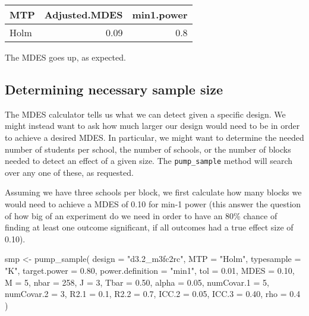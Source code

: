 \documentclass[
]{article}
\newenvironment{Shaded}{\begin{snugshade}}{\end{snugshade}}
\newcommand{\AttributeTok}[1]{\textcolor[rgb]{0.77,0.63,0.00}{#1}}
\newcommand{\DecValTok}[1]{\textcolor[rgb]{0.00,0.00,0.81}{#1}}
\newcommand{\FloatTok}[1]{\textcolor[rgb]{0.00,0.00,0.81}{#1}}
\newcommand{\FunctionTok}[1]{\textcolor[rgb]{0.00,0.00,0.00}{#1}}
\newcommand{\NormalTok}[1]{#1}
\newcommand{\OtherTok}[1]{\textcolor[rgb]{0.56,0.35,0.01}{#1}}
\newcommand{\StringTok}[1]{\textcolor[rgb]{0.31,0.60,0.02}{#1}}
\begin{document}
\begin{tabular}{l|r|r}
\hline
MTP & Adjusted.MDES & min1.power\\
\hline
Holm & 0.09 & 0.8\\
\hline
\end{tabular}

The MDES goes up, as expected.

\subsection{Determining necessary sample size}

The MDES calculator tells us what we can detect given a specific design.
We might instead want to ask how much larger our design would need to be
in order to achieve a desired MDES. In particular, we might want to
determine the needed number of students per school, the number of
schools, or the number of blocks needed to detect an effect of a given
size. The \texttt{pump\_sample} method will search over any one of
these, as requested.

Assuming we have three schools per block, we first calculate how many
blocks we would need to achieve a MDES of 0.10 for min-1 power (this
answer the question of how big of an experiment do we need in order to
have an 80\% chance of finding at least one outcome significant, if all
outcomes had a true effect size of 0.10).

\begin{Shaded}
\begin{Highlighting}[]
\NormalTok{smp }\OtherTok{\textless{}{-}} \FunctionTok{pump\_sample}\NormalTok{(}
  \AttributeTok{design =} \StringTok{"d3.2\_m3fc2rc"}\NormalTok{,}
  \AttributeTok{MTP =} \StringTok{"Holm"}\NormalTok{,}
  \AttributeTok{typesample =} \StringTok{"K"}\NormalTok{,}
  \AttributeTok{target.power =} \FloatTok{0.80}\NormalTok{, }\AttributeTok{power.definition =} \StringTok{"min1"}\NormalTok{, }\AttributeTok{tol =} \FloatTok{0.01}\NormalTok{,}
  \AttributeTok{MDES =} \FloatTok{0.10}\NormalTok{, }\AttributeTok{M =} \DecValTok{5}\NormalTok{, }\AttributeTok{nbar =} \DecValTok{258}\NormalTok{, }\AttributeTok{J =} \DecValTok{3}\NormalTok{,}
  \AttributeTok{Tbar =} \FloatTok{0.50}\NormalTok{, }\AttributeTok{alpha =} \FloatTok{0.05}\NormalTok{, }\AttributeTok{numCovar.1 =} \DecValTok{5}\NormalTok{, }\AttributeTok{numCovar.2 =} \DecValTok{3}\NormalTok{,}
  \AttributeTok{R2.1 =} \FloatTok{0.1}\NormalTok{, }\AttributeTok{R2.2 =} \FloatTok{0.7}\NormalTok{, }\AttributeTok{ICC.2 =} \FloatTok{0.05}\NormalTok{, }\AttributeTok{ICC.3 =} \FloatTok{0.40}\NormalTok{, }\AttributeTok{rho =} \FloatTok{0.4}\NormalTok{ )}
\end{Highlighting}
\end{Shaded}
\end{document}
